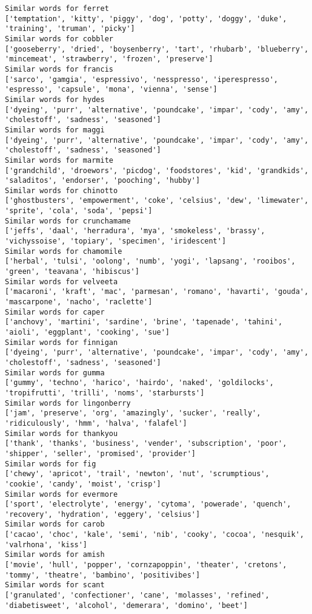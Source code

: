 \documentclass[11pt]{article}
\begin{document}
\begin{Verbatim}[commandchars=\\\{\}]
Similar words for ferret
['temptation', 'kitty', 'piggy', 'dog', 'potty', 'doggy', 'duke', 'training', 'truman', 'picky']
Similar words for cobbler
['gooseberry', 'dried', 'boysenberry', 'tart', 'rhubarb', 'blueberry', 'mincemeat', 'strawberry', 'frozen', 'preserve']
Similar words for francis
['sarco', 'gamgia', 'espressivo', 'nesspresso', 'iperespresso', 'espresso', 'capsule', 'mona', 'vienna', 'sense']
Similar words for hydes
['dyeing', 'purr', 'alternative', 'poundcake', 'impar', 'cody', 'amy', 'cholestoff', 'sadness', 'seasoned']
Similar words for maggi
['dyeing', 'purr', 'alternative', 'poundcake', 'impar', 'cody', 'amy', 'cholestoff', 'sadness', 'seasoned']
Similar words for marmite
['grandchild', 'droewors', 'picdog', 'foodstores', 'kid', 'grandkids', 'saladitos', 'endorser', 'pooching', 'hubby']
Similar words for chinotto
['ghostbusters', 'empowerment', 'coke', 'celsius', 'dew', 'limewater', 'sprite', 'cola', 'soda', 'pepsi']
Similar words for crunchamame
['jeffs', 'daal', 'herradura', 'mya', 'smokeless', 'brassy', 'vichyssoise', 'topiary', 'specimen', 'iridescent']
Similar words for chamomile
['herbal', 'tulsi', 'oolong', 'numb', 'yogi', 'lapsang', 'rooibos', 'green', 'teavana', 'hibiscus']
Similar words for velveeta
['macaroni', 'kraft', 'mac', 'parmesan', 'romano', 'havarti', 'gouda', 'mascarpone', 'nacho', 'raclette']
Similar words for caper
['anchovy', 'martini', 'sardine', 'brine', 'tapenade', 'tahini', 'aioli', 'eggplant', 'cooking', 'sue']
Similar words for finnigan
['dyeing', 'purr', 'alternative', 'poundcake', 'impar', 'cody', 'amy', 'cholestoff', 'sadness', 'seasoned']
Similar words for gumma
['gummy', 'techno', 'harico', 'hairdo', 'naked', 'goldilocks', 'tropifrutti', 'trilli', 'noms', 'starbursts']
Similar words for lingonberry
['jam', 'preserve', 'org', 'amazingly', 'sucker', 'really', 'ridiculously', 'hmm', 'halva', 'falafel']
Similar words for thankyou
['thank', 'thanks', 'business', 'vender', 'subscription', 'poor', 'shipper', 'seller', 'promised', 'provider']
Similar words for fig
['chewy', 'apricot', 'trail', 'newton', 'nut', 'scrumptious', 'cookie', 'candy', 'moist', 'crisp']
Similar words for evermore
['sport', 'electrolyte', 'energy', 'cytoma', 'powerade', 'quench', 'recovery', 'hydration', 'eggery', 'celsius']
Similar words for carob
['cacao', 'choc', 'kale', 'semi', 'nib', 'cooky', 'cocoa', 'nesquik', 'valrhona', 'kiss']
Similar words for amish
['movie', 'hull', 'popper', 'cornzapoppin', 'theater', 'cretons', 'tommy', 'theatre', 'bambino', 'positivibes']
Similar words for scant
['granulated', 'confectioner', 'cane', 'molasses', 'refined', 'diabetisweet', 'alcohol', 'demerara', 'domino', 'beet']

\end{Verbatim}
\end{document}
